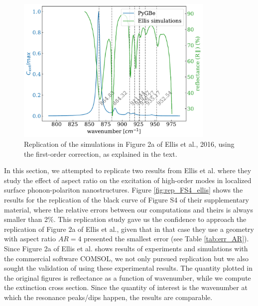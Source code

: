 \begin{figure}
    \centering
    \includegraphics[width=0.85\textwidth]{replication_FOA_fig2a_Ellis.pdf} 
    \caption{Replication of the simulations in Figure 2a of Ellis et al., 2016, using the first-order correction, as explained in the text.}
    \label{fig:rep_2a}
 \end{figure}


In this section, we attempted to replicate two results from Ellis et al. \cite{ellis2016} where they study the effect of aspect ratio on the 
excitation of high-order modes in localized surface phonon-polariton nanostructures. Figure \ref{fig:rep_FS4_ellis} shows the results for
the replication of the black curve of Figure S4 of their supplementary material, where the relative errors between our computations and 
theirs is always smaller than 2$\%$. This replication study gave us the confidence to approach the replication of Figure 2a of Ellis et al., 
given that in that case they use a geometry with aspect ratio $AR=4$ presented the smallest error (see Table \ref{tab:err_AR}). Since 
Figure 2a of Ellis et al. shows results of experiments and simulations with the commercial software COMSOL, we not only pursued replication 
but we also sought the validation of \pygbe using these experimental results. The quantity plotted in the original figures is reflectance as a 
function of wavenumber, while we compute the extinction cross section. Since the quantity of interest is the wavenumber at which the resonance 
peaks/dips happen, the results are comparable. 

